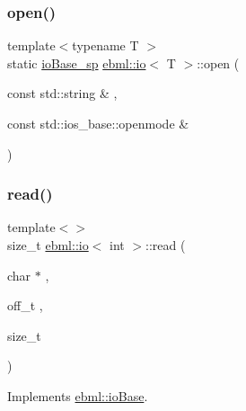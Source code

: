 \mbox{\label{classebml_1_1io_a98871b6a6ceafc80df00f95867b7cbe4}} 
\subsubsection{\texorpdfstring{open()}{open()}}
{\footnotesize\ttfamily template$<$typename T $>$ \\
static \mbox{\hyperlink{namespaceebml_a7bb59128ac6af27e47367938a846b569}{io\+Base\+\_\+sp}} \mbox{\hyperlink{classebml_1_1io}{ebml\+::io}}$<$ T $>$\+::open (\begin{DoxyParamCaption}\item[{const std\+::string \&}]{,  }\item[{const std\+::ios\+\_\+base\+::openmode \&}]{ }\end{DoxyParamCaption})\hspace{0.3cm}{\ttfamily [static]}}

\mbox{\label{classebml_1_1io_a3b291aa8fb7bbeeb3f9d2ef152c37115}} 
\subsubsection{\texorpdfstring{read()}{read()}\hspace{0.1cm}{\footnotesize\ttfamily [1/2]}}
{\footnotesize\ttfamily template$<$$>$ \\
size\+\_\+t \mbox{\hyperlink{classebml_1_1io}{ebml\+::io}}$<$ int $>$\+::read (\begin{DoxyParamCaption}\item[{char $\ast$}]{,  }\item[{off\+\_\+t}]{,  }\item[{size\+\_\+t}]{ }\end{DoxyParamCaption})\hspace{0.3cm}{\ttfamily [virtual]}}



Implements \mbox{\hyperlink{classebml_1_1ioBase_aba93b64f19016207b3d6c43183a2be07}{ebml\+::io\+Base}}.

\mbox{\label{classebml_1_1io_ad745dc2c29544750dcd38a21cba0a16c}} 
